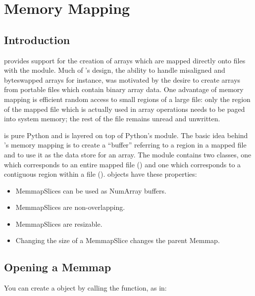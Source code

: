\chapter{Memory Mapping}
\label{cha:memmap}

\section{Introduction}
\label{sec:memmap-intro}

 provides support for the creation of arrays which are
mapped directly onto files with the  module.
Much of 's design, the ability to handle misaligned and
byteswapped arrays for instance, was motivated by the desire to create
arrays from portable files which contain binary array data.  One
advantage of memory mapping is efficient random access to small
regions of a large file: only the region of the mapped file which is
actually used in array operations needs to be paged into system
memory; the rest of the file remains unread and unwritten.

 is pure Python and is layered on top of
Python's  module.  The basic idea behind 's
memory mapping is to create a ``buffer'' referring to a region in a
mapped file and to use it as the data store for an array.  The
 module contains two classes, one which
corresponds to an entire mapped file () and one which
corresponds to a contiguous region within a file
().   objects have these
properties:

\begin{itemize}
\item MemmapSlices can be used as NumArray buffers.
\item MemmapSlices are non-overlapping.
\item MemmapSlices are resizable.
\item Changing the size of a MemmapSlice changes the parent Memmap.
\end{itemize}

\section{Opening a Memmap}
\label{sec:memmap-open}

You can create a  object by calling the  function,
as in:

